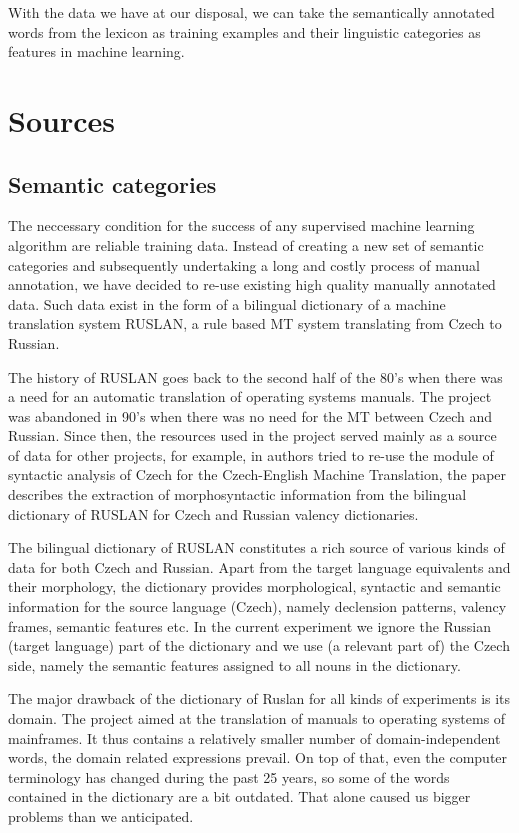 \documentclass[letterpaper]{article}
\newcommand{\todofn}[1] {
 \footnote{\textbf{TODO : #1}}}
\begin{document}
With the data we have at our disposal, we can take the semantically annotated words from the lexicon as training examples 
and their linguistic categories as features in machine learning.


\section{Sources}
\subsection{Semantic categories}
The neccessary condition for the success of any supervised machine learning algorithm are reliable training data. Instead of creating a new set of semantic categories and subsequently undertaking a long and costly process of manual annotation, we have decided to re-use existing high quality manually annotated data. Such data exist in the form of a bilingual dictionary of a machine translation system RUSLAN, a rule based MT system translating from Czech to Russian.

The history of RUSLAN \cite{oliva1989parser} goes back to the second half of the 80's when there was a need for an automatic translation of operating systems manuals. The project was abandoned in 90's when
there was no need for the MT between Czech and Russian. Since then, the resources used in the project served mainly as a source of data for other projects, for
example, in \cite{mt-recycled} authors tried to re-use the module
of syntactic analysis of Czech for the Czech-English Machine Translation,
the paper \cite{pisa2010} describes the extraction of morphosyntactic information from the bilingual dictionary of RUSLAN for Czech and Russian valency dictionaries.

The bilingual dictionary of RUSLAN constitutes a rich source of various kinds of data for both Czech and Russian. Apart from the target language equivalents and their morphology, the dictionary provides  morphological, syntactic and semantic information for the source language (Czech), namely declension patterns, valency frames, semantic features etc. In the current experiment we ignore the Russian (target language)
part of the dictionary and we use (a relevant part of) the Czech side, namely the semantic features assigned to all nouns in the dictionary. 

The major drawback of the dictionary of Ruslan for all kinds of experiments is its domain. The project aimed at the translation of manuals to operating systems of mainframes. It thus contains a relatively smaller number of domain-independent words, the domain related expressions prevail. On top of that, even the computer terminology has changed during the past 25 years, so  some of the words contained in the dictionary are a bit outdated. 
That alone caused us bigger problems than we anticipated.
\end{document}
